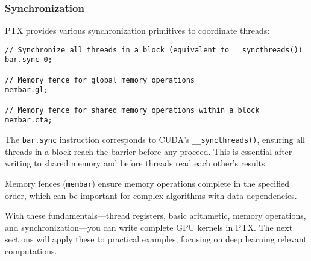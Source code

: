 \subsubsection{Synchronization}

PTX provides various synchronization primitives to coordinate threads:

\begin{lstlisting}[style=ptx]
// Synchronize all threads in a block (equivalent to __syncthreads())
bar.sync 0;

// Memory fence for global memory operations
membar.gl;

// Memory fence for shared memory operations within a block
membar.cta;
\end{lstlisting}

The \texttt{bar.sync} instruction corresponds to CUDA's \texttt{\_\_syncthreads()}, ensuring all threads in a block reach the barrier before any proceed. This is essential after writing to shared memory and before threads read each other's results.

Memory fences (\texttt{membar}) ensure memory operations complete in the specified order, which can be important for complex algorithms with data dependencies.

With these fundamentals—thread registers, basic arithmetic, memory operations, and synchronization—you can write complete GPU kernels in PTX. The next sections will apply these to practical examples, focusing on deep learning relevant computations.


